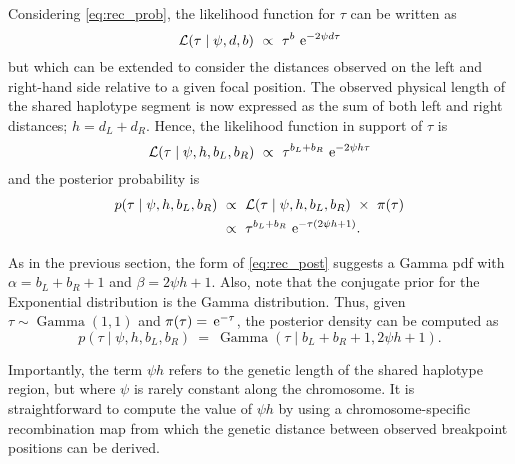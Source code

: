 Considering \cref{eq:rec_prob}, the likelihood function for $\tau$ can be written as
\begin{equation}\label{eq:rec_like_x}
	\mathcal{L}(\tau \mid \psi,d,b)~\propto~\tau^b \,\,\mathrm{e}^{-2\psi d \tau}
\end{equation}
but which can be extended to consider the distances observed on the left and right-hand side relative to a given focal position.
The observed physical length of the shared haplotype segment is now expressed as the sum of both left and right distances; \ie ${h = d_L + d_R}$.
Hence, the likelihood function in support of $\tau$ is
\begin{equation}\label{eq:rec_like}
	\mathcal{L}(\tau \mid \psi, h, b_L, b_R)~\propto~\tau^{b_L + b_R} \,\,\mathrm{e}^{-2\psi h \tau}
\end{equation}
and the posterior probability is
\begin{equation}\label{eq:rec_post}
\begin{split}
	p(\tau \mid \psi,h,b_L,b_R)
	&~\propto~
	\mathcal{L}(\tau \mid \psi, h, b_L, b_R)~\times~\pi(\tau) \\
	&~\propto~
	\tau^{b_L + b_R} \,\,\mathrm{e}^{-\tau(2\psi h +1)}\text{.}
\end{split}
\end{equation}

As in the previous section, the form of \cref{eq:rec_post} suggests a Gamma \gls{pdf} with ${\alpha = b_L + b_R +1}$ and ${\beta = 2\psi h +1}$.
Also, note that the conjugate prior for the Exponential distribution is the Gamma distribution.
Thus, given ${\tau\sim\operatorname{Gamma}(1,1)}$ and ${\pi(\tau)=\,\mathrm{e}^{-\tau}}$, the posterior density can be computed as
\begin{equation}
	p(\tau \mid \psi,h,b_L,b_R)~=~\operatorname{Gamma}(\tau\mid b_L + b_R +1, 2\psi h +1)\text{.}
\end{equation}

Importantly, the term ${\psi h}$ refers to the genetic length of the shared haplotype region, but where $\psi$ is rarely constant along the chromosome.
It is straightforward to compute the value of ${\psi h}$ by using a chromosome-specific recombination map from which the genetic distance between observed breakpoint positions can be derived.


